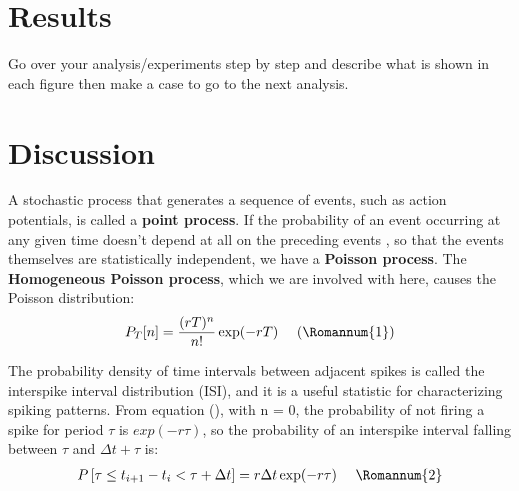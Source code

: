 \documentclass[9pt,twocolumn]{paper-template}
\begin{document}
\section*{Results}
Go over your analysis/experiments step by step and
describe what is shown in each figure then make a case
to go to the next analysis.\\


\section*{Discussion}
A stochastic process that generates a sequence of events, such as action
potentials, is called a \textbf{point process}. If the probability of an event occurring at any given time doesn't depend at all on the preceding events , so that the events themselves are statistically independent, we have a \textbf{Poisson process}. The \textbf{Homogeneous Poisson process}, which we are involved with here, causes the Poisson distribution: 
\begin{gather*}
P_{T}[n]=\frac{(r T)^{n}}{n !} \exp (-r T)\ \ \ \ (\Romannum{1})
\end{gather*}

The probability density of time intervals between adjacent spikes is called the interspike interval distribution (ISI), and it is a useful statistic for characterizing spiking patterns. From equation (), with n = 0, the probability of not firing a spike for period $ \tau $ is $ exp(-r\tau) $, so the probability of an interspike interval falling
between $ \tau $ and $ \Delta t + \tau $ is: 
\begin{gather*}
P\left[\tau \leq t_{i+1}-t_{i}<\tau+\Delta t\right]=r \Delta t \exp (-r \tau)\ \ \ \ \Romannum{2}
\end{gather*}
\end{document}

